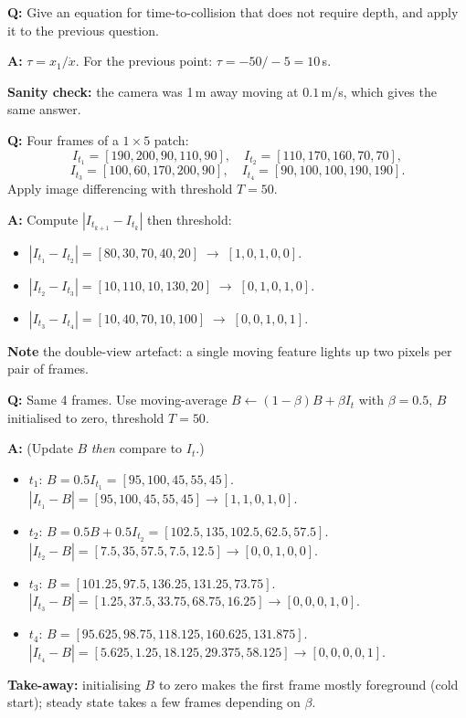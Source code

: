 \begin{exbox}
\textbf{Q:} Give an equation for time-to-collision that does not require depth, and apply it to the previous question.

\textbf{A:} $\tau = x_1 / \dot{x}$. For the previous point: $\tau = -50 / -5 = 10$\,s.

\textbf{Sanity check:} the camera was 1\,m away moving at $0.1$\,m/s, which gives the same answer.
\end{exbox}

\begin{exbox}
\textbf{Q:} Four frames of a $1 \times 5$ patch:
\[
I_{t_1}=[190,200,90,110,90], \quad I_{t_2}=[110,170,160,70,70],
\]
\[
I_{t_3}=[100,60,170,200,90], \quad I_{t_4}=[90,100,100,190,190].
\]
Apply image differencing with threshold $T = 50$.

\textbf{A:} Compute $|I_{t_{k+1}} - I_{t_k}|$ then threshold:
\begin{itemize}
  \item $|I_{t_1} - I_{t_2}| = [80,30,70,40,20] \;\to\; [1,0,1,0,0]$.
  \item $|I_{t_2} - I_{t_3}| = [10,110,10,130,20] \;\to\; [0,1,0,1,0]$.
  \item $|I_{t_3} - I_{t_4}| = [10,40,70,10,100] \;\to\; [0,0,1,0,1]$.
\end{itemize}
\textbf{Note} the double-view artefact: a single moving feature lights up two pixels per pair of frames.
\end{exbox}

\begin{exbox}
\textbf{Q:} Same 4 frames. Use moving-average $B \leftarrow (1-\beta) B + \beta I_t$ with $\beta = 0.5$, $B$ initialised to zero, threshold $T=50$.

\textbf{A:} (Update $B$ \emph{then} compare to $I_t$.)
\begin{itemize}
  \item $t_1$: $B = 0.5 I_{t_1} = [95,100,45,55,45]$. $|I_{t_1} - B| = [95,100,45,55,45] \to [1,1,0,1,0]$.
  \item $t_2$: $B = 0.5 B + 0.5 I_{t_2} = [102.5,135,102.5,62.5,57.5]$. $|I_{t_2} - B| = [7.5,35,57.5,7.5,12.5] \to [0,0,1,0,0]$.
  \item $t_3$: $B = [101.25,97.5,136.25,131.25,73.75]$. $|I_{t_3} - B| = [1.25,37.5,33.75,68.75,16.25] \to [0,0,0,1,0]$.
  \item $t_4$: $B = [95.625,98.75,118.125,160.625,131.875]$. $|I_{t_4} - B| = [5.625,1.25,18.125,29.375,58.125] \to [0,0,0,0,1]$.
\end{itemize}
\textbf{Take-away:} initialising $B$ to zero makes the first frame mostly foreground (cold start); steady state takes a few frames depending on $\beta$.
\end{exbox}

